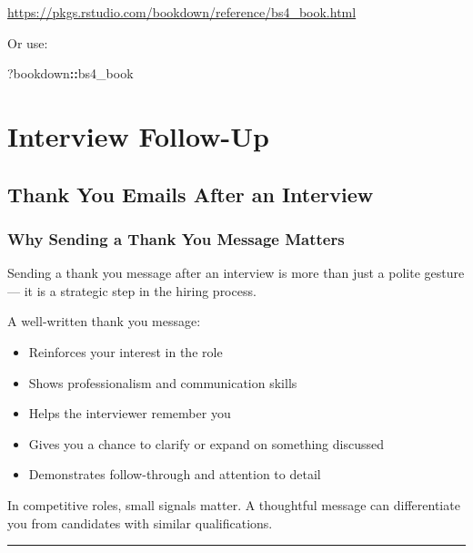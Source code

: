 \documentclass[
]{book}
\newenvironment{Shaded}{\begin{snugshade}}{\end{snugshade}}
\newcommand{\NormalTok}[1]{#1}
\newcommand{\SpecialCharTok}[1]{\textcolor[rgb]{0.81,0.36,0.00}{\textbf{#1}}}
\providecommand{\tightlist}{%
  \setlength{\itemsep}{0pt}\setlength{\parskip}{0pt}}
\theoremstyle{definition}
\theoremstyle{definition}
\theoremstyle{definition}
\theoremstyle{definition}
\theoremstyle{remark}
\begin{document}
\url{https://pkgs.rstudio.com/bookdown/reference/bs4_book.html}

Or use:

\begin{Shaded}
\begin{Highlighting}[]
\NormalTok{?bookdown}\SpecialCharTok{::}\NormalTok{bs4\_book}
\end{Highlighting}
\end{Shaded}

\chapter{Interview Follow-Up}\label{interview-follow-up}

\section{Thank You Emails After an Interview}\label{thank-you-emails-after-an-interview}

\subsection{Why Sending a Thank You Message Matters}\label{why-sending-a-thank-you-message-matters}

Sending a thank you message after an interview is more than just a polite gesture --- it is a strategic step in the hiring process.

A well-written thank you message:

\begin{itemize}
\tightlist
\item
  Reinforces your interest in the role\\
\item
  Shows professionalism and communication skills\\
\item
  Helps the interviewer remember you\\
\item
  Gives you a chance to clarify or expand on something discussed\\
\item
  Demonstrates follow-through and attention to detail
\end{itemize}

In competitive roles, small signals matter. A thoughtful message can differentiate you from candidates with similar qualifications.

\begin{center}\rule{0.5\linewidth}{0.5pt}\end{center}
\end{document}

